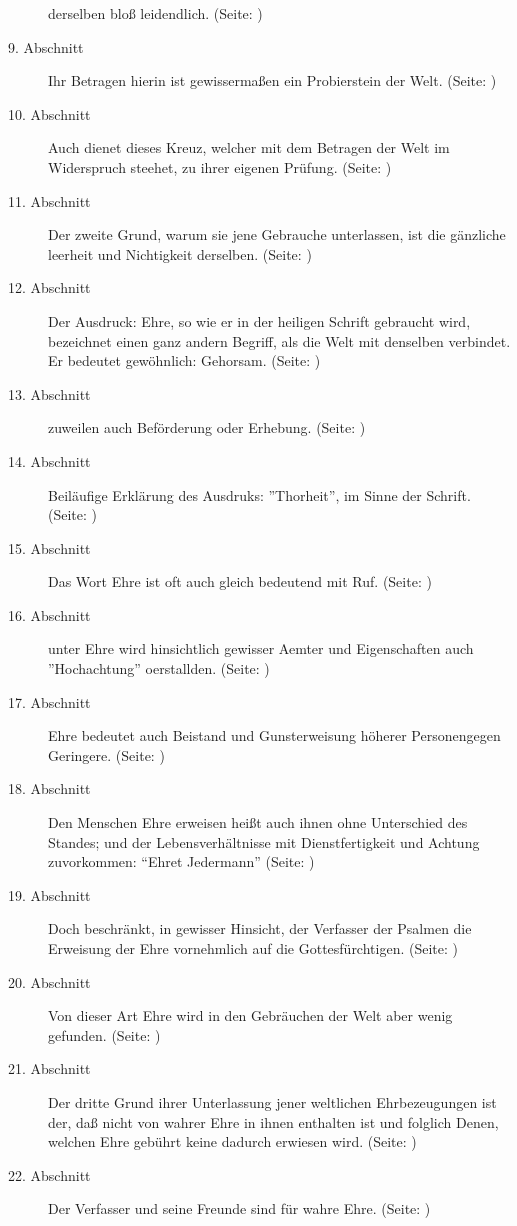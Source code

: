 \begin{description}
derselben bloß leidendlich. (Seite: \pageref{kap9_ab8})
\item[9. Abschnitt] Ihr Betragen hierin ist gewissermaßen ein Probierstein der
Welt. (Seite: \pageref{kap9_ab9})
\item[10. Abschnitt] Auch dienet dieses Kreuz, welcher mit dem Betragen der Welt
im Widerspruch steehet, zu ihrer eigenen Prüfung. (Seite: \pageref{kap9_ab10})
\item[11. Abschnitt] Der zweite Grund, warum sie jene Gebrauche unterlassen, ist
die gänzliche leerheit und Nichtigkeit derselben. (Seite: \pageref{kap9_ab11})
\item[12. Abschnitt] Der Ausdruck: Ehre, so wie er in der heiligen Schrift
gebraucht wird, bezeichnet einen ganz andern Begriff, als die Welt mit denselben
verbindet. Er bedeutet gewöhnlich: Gehorsam. (Seite: \pageref{kap9_ab12})
\item[13. Abschnitt] zuweilen auch Beförderung oder Erhebung. (Seite: \pageref{kap9_ab13})
\item[14. Abschnitt] Beiläufige Erklärung des Ausdruks: ''Thorheit'', im Sinne
der Schrift. (Seite: \pageref{kap9_ab14})
\item[15. Abschnitt] Das Wort Ehre ist oft auch gleich bedeutend mit Ruf. (Seite: \pageref{kap9_ab15})
\item[16. Abschnitt] unter Ehre wird hinsichtlich gewisser Aemter und
Eigenschaften auch ''Hochachtung'' oerstallden. (Seite: \pageref{kap9_ab16})
\item[17. Abschnitt] Ehre bedeutet auch Beistand und Gunsterweisung höherer
Personengegen Geringere. (Seite: \pageref{kap9_ab17})
\item[18. Abschnitt]  Den Menschen Ehre erweisen heißt auch ihnen ohne
Unterschied des Standes; und der Lebensverhältnisse mit Dienstfertigkeit und
Achtung zuvorkommen: "`Ehret Jedermann"' (Seite: \pageref{kap9_ab18})
\item[19. Abschnitt] Doch beschränkt, in gewisser Hinsicht, der Verfasser der
Psalmen die Erweisung der Ehre vornehmlich auf die Gottesfürchtigen. (Seite: \pageref{kap9_ab19})
\item[20. Abschnitt] Von dieser Art Ehre wird in den Gebräuchen der Welt aber
wenig gefunden. (Seite: \pageref{kap9_ab20})
\item[21. Abschnitt] Der dritte Grund ihrer Unterlassung jener weltlichen
Ehrbezeugungen ist der, daß nicht von wahrer Ehre in ihnen enthalten ist und
folglich Denen, welchen Ehre gebührt keine dadurch erwiesen wird. (Seite: \pageref{kap9_ab21})
\item[22. Abschnitt] Der Verfasser und seine Freunde sind für wahre Ehre. (Seite: \pageref{kap9_ab22})

\end{description}
